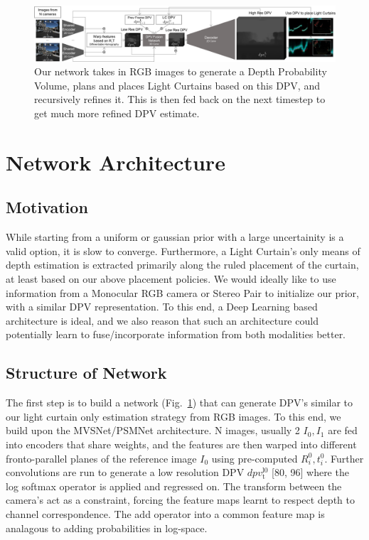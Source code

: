\begin{figure}[t!]
    \includegraphics[width=1.0\textwidth]{figures/network.pdf}
    \caption{Our network takes in RGB images to generate a Depth Probability Volume, plans and places Light Curtains based on this DPV, and recursively refines it. This is then fed back on the next timestep to get much more refined DPV estimate. }
    \label{fig:network}
\end{figure}
    
\section{Network Architecture}

\subsection{Motivation}

While starting from a uniform or gaussian prior with a large uncertainity is a valid option, it is slow to converge. Furthermore, a Light Curtain's only means of depth estimation is extracted primarily along the ruled placement of the curtain, at least based on our above placement policies. We would ideally like to use information from a Monocular RGB camera or Stereo Pair to initialize our prior, with a similar DPV representation. To this end, a Deep Learning based architecture is ideal, and we also reason that such an architecture could potentially learn to fuse/incorporate information from both modalities better.

\subsection{Structure of Network}

The first step is to build a network (Fig.~\ref{fig:network}) that can generate DPV's similar to our light curtain only estimation strategy from RGB images. To this end, we build upon the MVSNet/PSMNet \cite{chang2018pyramid} \cite{yao2018mvsnet} architecture. N images, usually 2 $I_{0}, I_{1}$ are fed into encoders that share weights, and the features are then warped into different fronto-parallel planes of the reference image $I_{0}$ using pre-computed $R_{i}^{0}, t_{i}^{0}$. Further convolutions are run to generate a low resolution DPV $dpv_{\mathrm{t}}^{\mathrm{l0}}$ [80, 96] where the log softmax operator is applied and regressed on. The transform between the camera's act as a constraint, forcing the feature maps learnt to respect depth to channel correspondence. The add operator into a common feature map is analagous to adding probabilities in log-space. 

